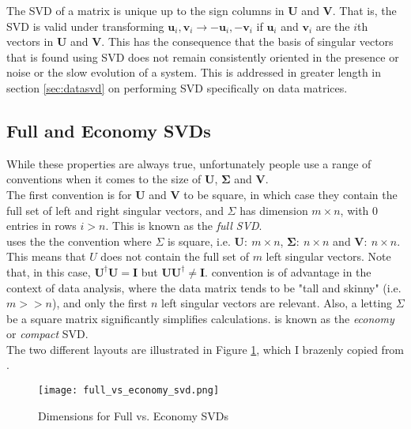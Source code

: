 The SVD of a matrix is unique up to the sign columns in $\mathbf{U}$ and $\mathbf{V}$. That is, the SVD is valid under transforming $\mathbf{u}_i, \mathbf{v}_i \rightarrow -\mathbf{u}_i, -\mathbf{v}_i $ if $\mathbf{u}_i$ and $ \mathbf{v}_i$ are the $i$th vectors in $\mathbf{U}$ and $\mathbf{V}$. This has the consequence that the basis of singular vectors that is found using SVD does not remain consistently oriented in the presence or noise or the slow evolution of a system. This is addressed in greater length in section \ref{sec:datasvd} on performing SVD specifically on data matrices.

\subsection{Full and Economy SVDs}
While these properties are always true, unfortunately people use a range of conventions when it comes to the size of $\mathbf{U}$, $\mathbf{\Sigma}$ and $\mathbf{V}$. \\

The first convention is for $\mathbf{U}$ and $\mathbf{V}$ to be square, in which case they contain the full set of left and right singular vectors, and $\Sigma$ has dimension $m\times n$, with $0$ entries in rows $i>n$. This is known as the \textit{full SVD}.\\

 uses the the convention where $\Sigma$ is square, i.e. $\mathbf{U}:\ m\times n$, $\mathbf{\Sigma}:\ n\times n$ and $\mathbf{V}:\ n\times n$. This means that $U$ does not contain the full set of $m$ left singular vectors. Note that, in this case, $\mathbf{U^{\dagger}}\mathbf{U} = \mathbf{I}$ but $\mathbf{U}\mathbf{U^{\dagger}} \neq \mathbf{I}$.  convention is of advantage in the context of data analysis, where the data matrix tends to be "tall and skinny" (i.e. $m>>n$), and only the first $n$ left singular vectors are relevant. Also, a letting $\Sigma$ be a square matrix significantly simplifies calculations.  is known as the \textit{economy} or \textit{compact} SVD.\\

The two different layouts are illustrated in Figure \ref{fig:full_vs_economy_svd}, which I brazenly copied from .

\begin{figure}
\centering
\texttt{[image: full\_vs\_economy\_svd.png]}
\caption{Dimensions for Full vs. Economy SVDs}
\label{fig:full_vs_economy_svd}
\end{figure}

